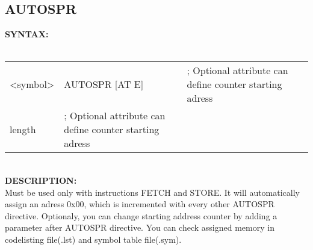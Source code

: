                 \subsection{AUTOSPR}
                \textbf{SYNTAX:}\\
                            \\ {
                                    \texttt{}
                                    \begin{tabular}[h!]{llll}
                                    { \color{highlight_symbol} <symbol> }  &
                                    { \color{highlight_directive} AUTOSPR }
                                    { \color{highlight_constant} [AT E] } & { \color{highlight_comment} ; Optional attribute can define
                                                                                                        counter starting adress }\\
                                    { \color{highlight_constant} length } & { \color{highlight_comment} ; Optional attribute can define
                                                                                                        counter starting adress }\\
                                    \end{tabular}
                            }
                            \\
            \textbf{DESCRIPTION:}\\
            Must be used only with instructions FETCH and STORE. It will automatically assign an
            adress 0x00, which is incremented with every other AUTOSPR directive. Optionaly, you can change starting address counter by adding a parameter
            after AUTOSPR directive. You can check assigned memory in codelisting file(.lst) and symbol table file(.sym).

